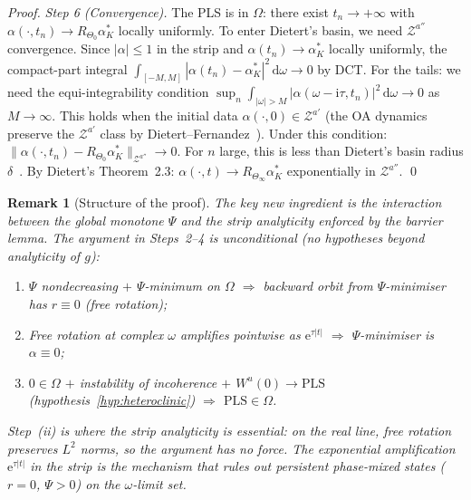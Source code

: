 \documentclass[11pt,a4paper]{article}
\newtheorem{remark}[theorem]{Remark}
\theoremstyle{definition}
\begin{document}
\begin{proof}
\emph{Step 6 (Convergence).} The PLS is in $\Omega$: there exist $t_n \to +\infty$ with $\alpha(\cdot, t_n) \to R_{\Theta_0}\alpha^*_K$ locally uniformly. To enter Dietert's basin, we need $\mathcal{Z}^{a''}$ convergence. Since $|\alpha| \leq 1$ in the strip and $\alpha(t_n) \to \alpha^*_K$ locally uniformly, the compact-part integral $\int_{[-M,M]}|\alpha(t_n) - \alpha^*_K|^2\,\mathrm{d}\omega \to 0$ by DCT. For the tails: we need the equi-integrability condition $\sup_n\int_{|\omega|>M}|\alpha(\omega-\mathrm{i}\tau, t_n)|^2\,\mathrm{d}\omega \to 0$ as $M \to \infty$. This holds when the initial data $\alpha(\cdot,0) \in \mathcal{Z}^{a'}$ (the OA dynamics preserve the $\mathcal{Z}^{a'}$ class by Dietert--Fernandez~\cite{dietert-fernandez2018}). Under this condition: $\|\alpha(\cdot, t_n) - R_{\Theta_0}\alpha^*_K\|_{\mathcal{Z}^{a''}} \to 0$. For $n$ large, this is less than Dietert's basin radius $\delta$~\cite{dietert2017}. By Dietert's Theorem~2.3: $\alpha(\cdot, t) \to R_{\Theta_\infty}\alpha^*_K$ exponentially in $\mathcal{Z}^{a''}$. \qed
\end{proof}

\begin{remark}[Structure of the proof]\label{rem:proof-structure}
The key new ingredient is the interaction between the global monotone $\Psi$ and the \emph{strip analyticity} enforced by the barrier lemma. The argument in Steps~2--4 is unconditional (no hypotheses beyond analyticity of $g$):
\begin{enumerate}[label=(\roman*)]
\item $\Psi$ nondecreasing $+$ $\Psi$-minimum on $\Omega$ $\Rightarrow$ backward orbit from $\Psi$-minimiser has $r \equiv 0$ (free rotation);
\item Free rotation at complex $\omega$ amplifies pointwise as $\mathrm{e}^{\tau|t|}$ $\Rightarrow$ $\Psi$-minimiser is $\alpha \equiv 0$;
\item $0 \in \Omega$ $+$ instability of incoherence $+$ $W^u(0) \to \mathrm{PLS}$ (hypothesis~\ref{hyp:heteroclinic}) $\Rightarrow$ $\mathrm{PLS} \in \Omega$.
\end{enumerate}
Step~(ii) is where the strip analyticity is essential: on the real line, free rotation preserves $L^2$ norms, so the argument has no force. The exponential amplification $\mathrm{e}^{\tau|t|}$ in the strip is the mechanism that rules out persistent phase-mixed states ($r = 0$, $\Psi > 0$) on the $\omega$-limit set.
\end{remark}
\end{document}
